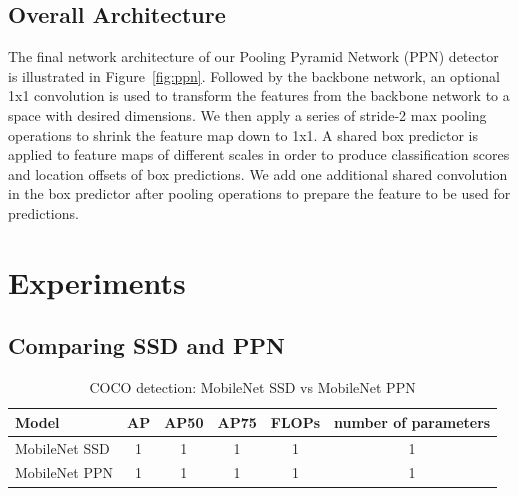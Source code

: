 \documentclass[10pt,twocolumn,letterpaper]{article}
\begin{document}
\subsection{Overall Architecture}



The final network architecture of our Pooling Pyramid Network (PPN) detector is illustrated in Figure~\ref{fig:ppn}.
Followed by the backbone network, an optional 1x1 convolution is used to transform the features from the backbone network to a space with desired dimensions.
We then apply a series of stride-2 max pooling operations to shrink the feature map down to 1x1.
A shared box predictor is applied to feature maps of different scales
in order to produce classification scores and location offsets of box predictions.
We add one additional shared convolution in the box predictor after pooling operations
to prepare the feature to be used for predictions.


\section{Experiments}

\subsection{Comparing SSD and PPN}


\begin{table}[t]
\begin{center}
\begin{tabular}{l|c|c|c|c|c}
Model & AP & AP50 & AP75 & FLOPs & number of parameters \\
\hline
\hline
MobileNet SSD & 1 & 1 & 1 & 1 & 1 \\
\hline
MobileNet PPN & 1 & 1 & 1 & 1 & 1 \\
\end{tabular}
\end{center}
\caption{COCO detection: MobileNet SSD vs MobileNet PPN}
\end{table}




{\small


}
\end{document}
